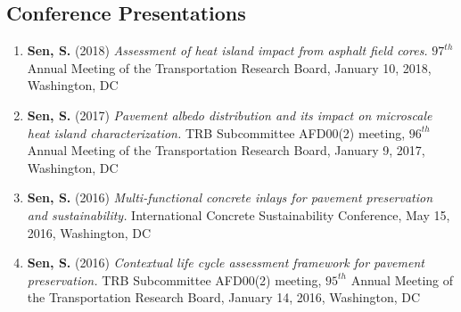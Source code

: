 \documentclass[12pt]{article}
\begin{document}
\subsection*{Conference Presentations}
\begin{enumerate}[label=(\arabic*)]
	\item \textbf{Sen, S.} (2018) \textit{Assessment of heat island impact from asphalt field cores.} $97^{th}$ Annual Meeting of the Transportation Research Board, January 10, 2018, Washington, DC
	\item \textbf{Sen, S.} (2017) \textit{Pavement albedo distribution and its impact on microscale heat island characterization.} TRB Subcommittee AFD00(2) meeting, $96^{th}$ Annual Meeting of the Transportation Research Board, January 9, 2017, Washington, DC
	\item \textbf{Sen, S.} (2016) \textit{Multi-functional concrete inlays for pavement preservation and sustainability.} International Concrete Sustainability Conference, May 15, 2016, Washington, DC
	\item \textbf{Sen, S.} (2016) \textit{Contextual life cycle assessment framework for pavement preservation.} TRB Subcommittee AFD00(2) meeting, $95^{th}$ Annual Meeting of the Transportation Research Board, January 14, 2016, Washington, DC
\end{enumerate}
\end{document}
